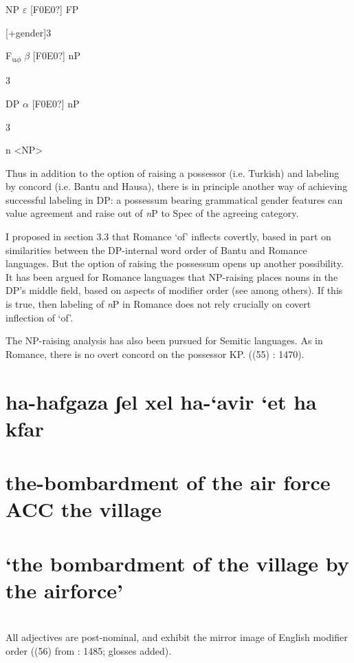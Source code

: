 \documentclass[output=paper
,modfonts
,nonflat]{langsci/langscibook}
\begin{document}
NP           ${\varepsilon}$      [F0E0?]     FP

[+gender]3

F\textsubscript{u}\textsubscript{${\phi}$}       ${\beta}$    [F0E0?]     nP

3

DP     ${\alpha}$     [F0E0?]     nP  

3

n          <NP>  

Thus in addition to the option of raising a possessor (i.e. Turkish) and labeling by concord (i.e. Bantu and Hausa), there is in principle another way of achieving successful labeling in DP: a possessum bearing grammatical gender features can value agreement and raise out of \textit{n}P to Spec of the agreeing category.

I proposed in section 3.3 that Romance ‘of’ inflects covertly, based in part on similarities between the DP-internal word order of Bantu and Romance languages. But the option of raising the possessum opens up another possibility. It has been argued for Romance languages that NP-raising places nouns in the DP’s middle field, based on aspects of modifier order (see \citealt{Lanezlinger2004} among others). If this is true, then labeling of \textit{n}P in Romance does not rely crucially on covert inflection of ‘of’. 

The NP-raising analysis has also been pursued for Semitic languages. As in Romance, there is no overt concord on the possessor KP. ((55) \citealt{Shlonsky2004}: 1470).

\section{  ha-hafgaza          ʃel xel     ha-‘avir     ‘et     ha     kfar} 
\label{bkm:Ref512438942}\section{    the-bombardment  of  the   air force   ACC   the   village}
\section{    ‘the bombardment of the village by the airforce’}
\section{\rmfamily} 

All adjectives are post-nominal, and exhibit the mirror image of English modifier order ((56) from \citealt{Shlonsky2004}: 1485; glosses added).
\end{document}
